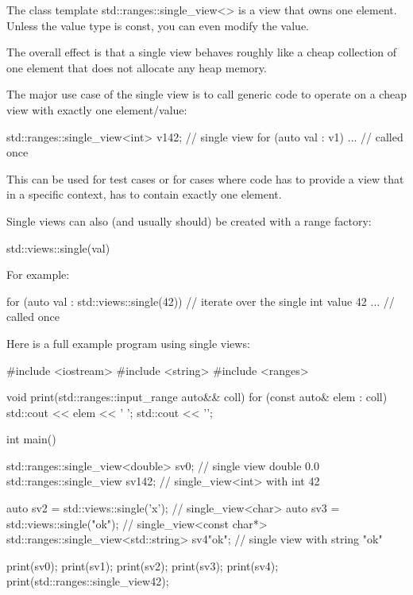 The class template std::ranges::single\_view<> is a view that owns one element. Unless the value type is const, you can even modify the value.

The overall effect is that a single view behaves roughly like a cheap collection of one element that does not allocate any heap memory.

The major use case of the single view is to call generic code to operate on a cheap view with exactly one element/value:

\begin{cpp}
std::ranges::single_view<int> v1{42}; // single view
for (auto val : v1) {
	... // called once
}
\end{cpp}

This can be used for test cases or for cases where code has to provide a view that in a specific context, has to contain exactly one element.


Single views can also (and usually should) be created with a range factory:

\begin{cpp}
std::views::single(val)
\end{cpp}

For example:

\begin{cpp}
for (auto val : std::views::single(42)) { // iterate over the single int value 42
	... // called once
}
\end{cpp}

Here is a full example program using single views:


\begin{cpp}
#include <iostream>
#include <string>
#include <ranges>

void print(std::ranges::input_range auto&& coll)
{
	for (const auto& elem : coll) {
		std::cout << elem << ' ';
	}
	std::cout << '\n';
}

int main()
{
	std::ranges::single_view<double> sv0; // single view double 0.0
	std::ranges::single_view sv1{42}; // single_view<int> with int 42
	
	auto sv2 = std::views::single('x'); // single_view<char>
	auto sv3 = std::views::single("ok"); // single_view<const char*>
	std::ranges::single_view<std::string> sv4{"ok"}; // single view with string "ok"
	
	print(sv0);
	print(sv1);
	print(sv2);
	print(sv3);
	print(sv4);
	print(std::ranges::single_view{42});
}
\end{cpp}

